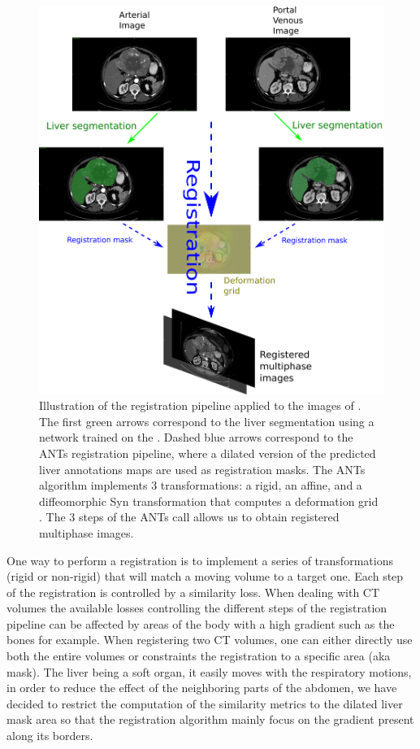 \begin{figure}[th!]
\centering
\includegraphics[width=0.7\linewidth]{images/RegistrationTCIA_pipeline_vertical2}
\caption{Illustration of the registration pipeline applied to the images of . The first green arrows correspond to the liver segmentation using a network trained on the . Dashed blue arrows correspond to the ANTs registration pipeline, where a dilated version of the predicted liver annotations maps are used as registration masks. The ANTs algorithm implements 3 transformations: a rigid, an affine, and a diffeomorphic Syn transformation that computes a deformation grid \cite{Avants2008}. The 3 steps of the ANTs call allows us to obtain registered multiphase images.}
\label{fig:RegistrationTCIA_pipeline_vertical2}
\end{figure}




One way to perform a registration is to implement a series of
transformations (rigid or non-rigid) that will match a moving volume to
a target one. Each step of the registration is controlled by a
similarity loss.
When dealing with CT volumes the available losses controlling the
different steps of the registration pipeline can be affected by areas of
the body with a high gradient such as the bones for example. When
registering two CT volumes, one can either directly use both the entire
volumes or constraints the registration to a specific area (aka mask).
The liver being a soft organ, it easily moves with the respiratory
motions, in order to reduce the effect of the neighboring parts of the
abdomen, we have decided to restrict the computation of the similarity
metrics to the dilated liver mask area so that the registration
algorithm mainly focus on the gradient present along its borders.

